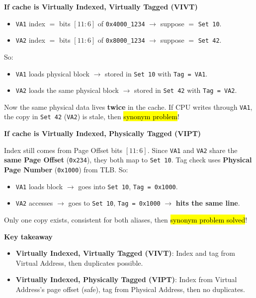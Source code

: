 \begin{examplebox}
    \begin{flushleft}
        \textcolor{Red2}{ \textbf{If cache is Virtually Indexed, Virtually Tagged (VIVT)}}
    \end{flushleft}
    \begin{itemize}
        \item \texttt{VA1} index $=$ bits $[11:6]$ of \texttt{0x4000\_1234} $\rightarrow$ suppose $=$ \texttt{Set 10}.
        \item \texttt{VA2} index $=$ bits $[11:6]$ of \texttt{0x8000\_1234} $\rightarrow$ suppose $=$ \texttt{Set 42}.
    \end{itemize}
    So:
    \begin{itemize}
        \item \texttt{VA1} loads physical block $\rightarrow$ stored in \texttt{Set 10} with \texttt{Tag = VA1}.
        \item \texttt{VA2} loads the same physical block $\rightarrow$ stored in \texttt{Set 42} with \texttt{Tag = VA2}.
    \end{itemize}
    Now the same physical data lives \textbf{twice} in the cache. If CPU writes through \texttt{VA1}, the copy in \texttt{Set 42} (\texttt{VA2}) is stale, then \hl{synonym problem}!

    \begin{flushleft}
        \textcolor{Green3}{ \textbf{If cache is Virtually Indexed, Physically Tagged (VIPT)}}
    \end{flushleft}
    Index still comes from Page Offset bits $[11:6]$. Since \texttt{VA1} and \texttt{VA2} share the \textbf{same Page Offset} (\texttt{0x234}), they both map to \texttt{Set 10}. Tag check uses \textbf{Physical Page Number} (\texttt{0x1000}) from TLB. So:
    \begin{itemize}
        \item \texttt{VA1} loads block $\rightarrow$ goes into \texttt{Set 10}, \texttt{Tag = 0x1000}.
        \item \texttt{VA2} accesses $\rightarrow$ goes to \texttt{Set 10}, \texttt{Tag = 0x1000} $\rightarrow$ \textbf{hits the same line}.
    \end{itemize}
    Only one copy exists, consistent for both aliases, then \hl{synonym problem solved}!

    \highspace
    \begin{flushleft}
        \textcolor{Green3}{ \textbf{Key takeaway}}
    \end{flushleft}
    \begin{itemize}
        \item \textbf{Virtually Indexed, Virtually Tagged (VIVT)}: Index and tag from Virtual Address, then duplicates possible.
        \item \textbf{Virtually Indexed, Physically Tagged (VIPT)}: Index from Virtual Address's page offset (safe), tag from Physical Address, then no duplicates.
    \end{itemize}
\end{examplebox}

